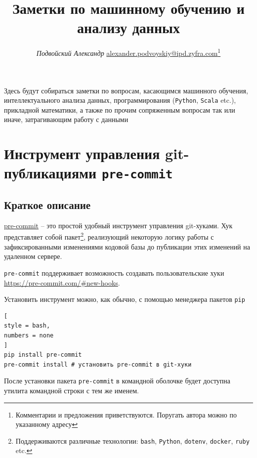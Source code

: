 \documentclass[%
	11pt,
	a4paper,
	utf8,
		]{article}
\begin{document}
\title{Заметки по машинному обучению и анализу данных}

\author{{\itshape Подвойский Александр} 
\href{mailto:alexander.podvoyskiy@ipd.zyfra.com}{\ttfamily alexander.podvoyskiy@ipd.zyfra.com}\footnote{Комментарии и предложения приветствуются. Поругать автора можно по указанному адресу}}

\date{}
\maketitle

\thispagestyle{fancy}

Здесь будут собираться заметки по вопросам, касающимся машинного обучения,
интеллектуального анализа данных, программирования (\texttt{Python}, \texttt{Scala} etc.), прикладной математики, а также по прочим сопряженным вопросам так или иначе, затрагивающим работу с данными



\tableofcontents

\section{Инструмент управления git-публикациями \texttt{pre-commit}}

\subsection{Краткое описание}

\href{https://pre-commit.com/#new-hooks}{\ttfamily  pre-commit} -- это простой удобный инструмент управления git-хуками. Хук представляет собой пакет\footnote{Поддерживаются различные технологии: \texttt{bash}, \texttt{Python}, \texttt{dotenv}, \texttt{docker}, \texttt{ruby} etc.}, реализующий некоторую логику работы с зафиксированными изменениями кодовой базы до публикации этих изменений на удаленном сервере.

\texttt{pre-commit} поддерживает возможность создавать пользовательские хуки \url{https://pre-commit.com/#new-hooks}.

Установить инструмент можно, как обычно, с помощью менеджера пакетов \texttt{pip}
\begin{lstlisting}[
style = bash,
numbers = none	
]
pip install pre-commit
pre-commit install # установить pre-commit в git-хуки
\end{lstlisting}

После установки пакета \texttt{pre-commit} в командной оболочке будет доступна утилита командной строки с тем же именем.
\end{document}
